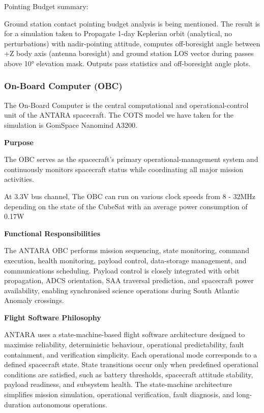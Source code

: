 Pointing Budget summary:

Ground station contact pointing budget analysis is being mentioned. The
result is for a simulation taken to Propagate 1-day Keplerian orbit
(analytical, no perturbations) with nadir-pointing attitude, computes
off-boresight angle between +Z body axis (antenna boresight) and ground
station LOS vector during passes above 10° elevation mask. Outputs pass
statistics and off-boresight angle plots.


\subsubsection{On-Board Computer (OBC)}

The On-Board Computer is the central computational and
operational-control unit of the ANTARA spacecraft. The COTS model we
have taken for the simulation is GomSpace Nanomind A3200.

\textbf{Purpose}

The OBC serves as the spacecraft's primary operational-management system
and continuously monitors spacecraft status while coordinating all major
mission activities.

At 3.3V bus channel, The OBC can run on various clock speeds from 8 -
32MHz depending on the state of the CubeSat with an average power
consumption of 0.17W

\textbf{Functional Responsibilities}

The ANTARA OBC performs mission sequencing, state monitoring, command
execution, health monitoring, payload control, data-storage management,
and communications scheduling. Payload control is closely integrated
with orbit propagation, ADCS orientation, SAA traversal prediction, and
spacecraft power availability, enabling synchronised science operations
during South Atlantic Anomaly crossings.

\textbf{Flight Software Philosophy}

ANTARA uses a state-machine-based flight software architecture designed
to maximise reliability, deterministic behaviour, operational
predictability, fault containment, and verification simplicity. Each
operational mode corresponds to a defined spacecraft state. State
transitions occur only when predefined operational conditions are
satisfied, such as battery thresholds, spacecraft attitude stability,
payload readiness, and subsystem health. The state-machine architecture
simplifies mission simulation, operational verification, fault
diagnosis, and long-duration autonomous operations.


